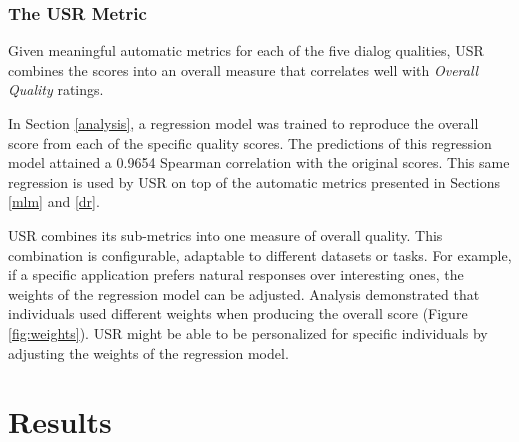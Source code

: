 \documentclass[11pt,a4paper]{article}
\begin{document}
\subsubsection{The USR Metric}

Given meaningful automatic metrics for each of the five dialog qualities, USR combines the scores into an overall measure that correlates well with \textit{Overall Quality} ratings. 

In Section \ref{analysis}, a regression model was trained to reproduce the overall score from each of the specific quality scores. The predictions of this regression model attained a 0.9654 Spearman correlation with the original scores. This same regression is used by USR on top of the automatic metrics presented in Sections \ref{mlm} and \ref{dr}. 

USR combines its sub-metrics into one measure of overall quality. This combination is configurable, adaptable to different datasets or tasks. For example, if a specific application prefers natural responses over interesting ones, the weights of the regression model can be adjusted. Analysis demonstrated that individuals used different weights when producing the overall score (Figure \ref{fig:weights}). USR might be able to be personalized for specific individuals by adjusting the weights of the regression model.









\section{Results}
\end{document}
